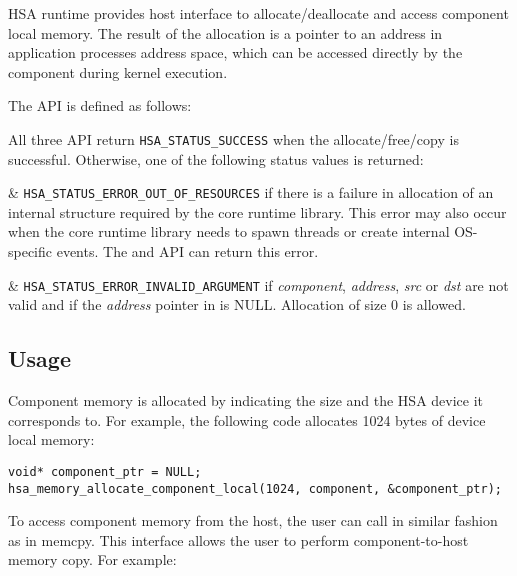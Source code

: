 H\-S\-A runtime provides host interface to allocate/deallocate and
access component local memory. The result of the allocation is a
pointer to an address in application processes address space, which
can be accessed directly by the component during kernel execution.

The API is defined as follows:



All three API return \texttt{HSA\_STATUS\_SUCCESS} when the
allocate/free/copy is successful. Otherwise, one of the following
status values is returned:

\begin{easylist}

& \texttt{HSA\_STATUS\_ERROR\_OUT\_OF\_RESOURCES} if there is a
failure in allocation of an internal structure required by the core
runtime library. This error may also occur when the core runtime
library needs to spawn threads or create internal OS-specific
events. The  and
 API can
return this error.

& \texttt{HSA\_STATUS\_ERROR\_INVALID\_ARGUMENT} if {\itshape
component}, {\itshape address}, {\itshape src} or {\itshape dst} are
not valid and if the {\itshape address} pointer in
 is NULL. Allocation
of size 0 is allowed.

\end{easylist}

\hypertarget{coreapi_device_memory_usage}{}\subsection{Usage}\label{coreapi_device_memory_usage}

Component memory is allocated by indicating the size and the H\-S\-A
device it corresponds to. For example, the following code allocates
1024 bytes of device local memory\-:

\begin{framed}
\begin{lstlisting}
void* component_ptr = NULL;
hsa_memory_allocate_component_local(1024, component, &component_ptr);
\end{lstlisting}
\end{framed}

To access component memory from the host, the user can call
 in similar
fashion as in memcpy. This interface allows the user to
perform component-\/to-\/host memory copy. For example\-:

